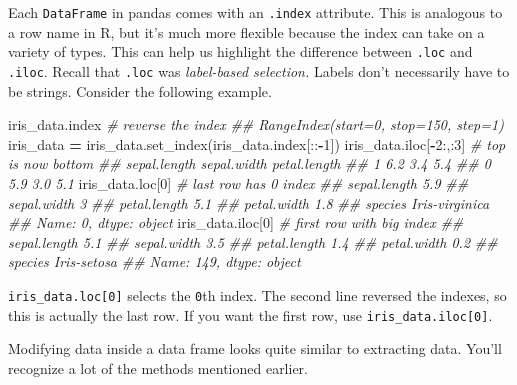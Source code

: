 \documentclass[
  12pt,
  krantz2]{krantz}
\makeatletter
\newenvironment{Shaded}{\begin{snugshade}}{\end{snugshade}}
\newcommand{\CommentTok}[1]{\textcolor[rgb]{0.37,0.37,0.37}{\textit{#1}}}
\newcommand{\DecValTok}[1]{\textcolor[rgb]{0.06,0.06,0.06}{#1}}
\newcommand{\NormalTok}[1]{#1}
\newcommand{\OperatorTok}[1]{\textcolor[rgb]{0.43,0.43,0.43}{\textbf{#1}}}
\newenvironment{kframe}{%
\medskip{}
\setlength{\fboxsep}{.8em}
 \def\at@end@of@kframe{}%
 \ifinner\ifhmode%
  \def\at@end@of@kframe{\end{minipage}}%
  \begin{minipage}{\columnwidth}%
 \fi\fi%
 \def\FrameCommand##1{\hskip\@totalleftmargin \hskip-\fboxsep
 \colorbox{shadecolor}{##1}\hskip-\fboxsep
     \hskip-\linewidth \hskip-\@totalleftmargin \hskip\columnwidth}%
 \MakeFramed {\advance\hsize-\width
   \@totalleftmargin\z@ \linewidth\hsize
   \@setminipage}}%
 {\par\unskip\endMakeFramed%
 \at@end@of@kframe}
\renewenvironment{Shaded}{\begin{kframe}}{\end{kframe}}
\makeatother
\begin{document}
Each \texttt{DataFrame} in pandas comes with an \texttt{.index} attribute. This is analogous to a row name in R, but it's much more flexible because the index can take on a variety of types. This can help us highlight the difference between \texttt{.loc} and \texttt{.iloc}. Recall that \texttt{.loc} was \emph{label-based selection.} Labels don't necessarily have to be strings. Consider the following example.

\begin{Shaded}
\begin{Highlighting}[]
\NormalTok{iris\_data.index}
\CommentTok{\# reverse the index}
\CommentTok{\#\# RangeIndex(start=0, stop=150, step=1)}
\NormalTok{iris\_data }\OperatorTok{=}\NormalTok{ iris\_data.set\_index(iris\_data.index[::}\OperatorTok{{-}}\DecValTok{1}\NormalTok{]) }
\NormalTok{iris\_data.iloc[}\OperatorTok{{-}}\DecValTok{2}\NormalTok{:,:}\DecValTok{3}\NormalTok{] }\CommentTok{\# top is now bottom}
\CommentTok{\#\#    sepal.length  sepal.width  petal.length}
\CommentTok{\#\# 1           6.2          3.4           5.4}
\CommentTok{\#\# 0           5.9          3.0           5.1}
\NormalTok{iris\_data.loc[}\DecValTok{0}\NormalTok{] }\CommentTok{\# last row has 0 index}
\CommentTok{\#\# sepal.length               5.9}
\CommentTok{\#\# sepal.width                  3}
\CommentTok{\#\# petal.length               5.1}
\CommentTok{\#\# petal.width                1.8}
\CommentTok{\#\# species         Iris{-}virginica}
\CommentTok{\#\# Name: 0, dtype: object}
\NormalTok{iris\_data.iloc[}\DecValTok{0}\NormalTok{] }\CommentTok{\# first row with big index }
\CommentTok{\#\# sepal.length            5.1}
\CommentTok{\#\# sepal.width             3.5}
\CommentTok{\#\# petal.length            1.4}
\CommentTok{\#\# petal.width             0.2}
\CommentTok{\#\# species         Iris{-}setosa}
\CommentTok{\#\# Name: 149, dtype: object}
\end{Highlighting}
\end{Shaded}

\texttt{iris\_data.loc{[}0{]}} selects the \texttt{0}th index. The second line reversed the indexes, so this is actually the last row. If you want the first row, use \texttt{iris\_data.iloc{[}0{]}}.

Modifying data inside a data frame looks quite similar to extracting data. You'll recognize a lot of the methods mentioned earlier.
\end{document}

